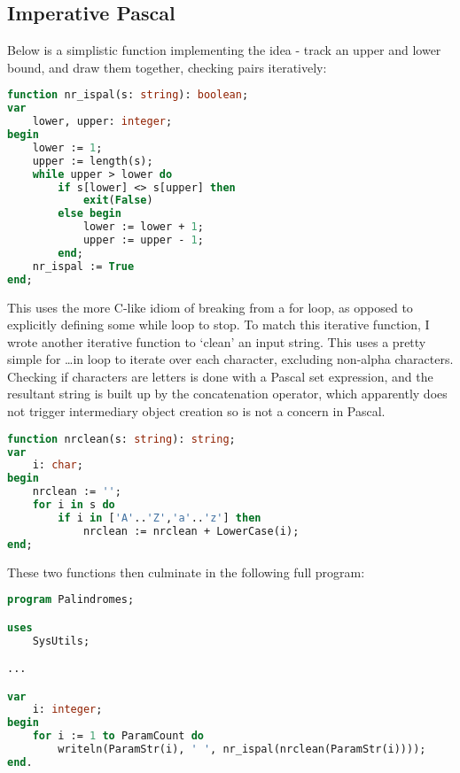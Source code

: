 \documentclass[fleqn,a4paper,11pt]{article}
\begin{document}
    \subsection{Imperative Pascal}

    Below is a simplistic function implementing the idea - track an upper and
    lower bound, and draw them together, checking pairs iteratively:

\begin{lstlisting}[language=Pascal, caption=Nonrecursive palindrome function in Pascal]
function nr_ispal(s: string): boolean;
var
    lower, upper: integer;
begin
    lower := 1;
    upper := length(s);
    while upper > lower do
        if s[lower] <> s[upper] then
            exit(False)
        else begin
            lower := lower + 1;
            upper := upper - 1;
        end;
    nr_ispal := True
end;
\end{lstlisting}

    This uses the more C-like idiom of breaking from a for loop, as opposed to
    explicitly defining some while loop to stop. To match this iterative
    function, I wrote another iterative function to `clean' an input string.
    This uses a pretty simple for \ldots in loop to iterate over each character,
    excluding non-alpha characters. Checking if characters are letters is done
    with a Pascal set expression, and the resultant string is built up by the
    concatenation operator, which apparently does not trigger intermediary
    object creation so is not a concern in Pascal.

\begin{lstlisting}[language=Pascal, caption=Nonrecursive `clean' function in Pascal]
function nrclean(s: string): string;
var
    i: char;
begin
    nrclean := '';
    for i in s do
        if i in ['A'..'Z','a'..'z'] then
            nrclean := nrclean + LowerCase(i);
end;
\end{lstlisting}

    These two functions then culminate in the following full program:

\begin{lstlisting}[language=Pascal, caption=Remainder of nonrecursive Pascal program]
program Palindromes;

uses
    SysUtils;

...

var
    i: integer;
begin
    for i := 1 to ParamCount do
        writeln(ParamStr(i), ' ', nr_ispal(nrclean(ParamStr(i))));
end.
\end{lstlisting}
\end{document}
